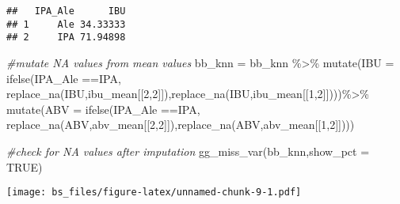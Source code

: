 \documentclass[
]{article}
\newenvironment{Shaded}{\begin{snugshade}}{\end{snugshade}}
\newcommand{\AttributeTok}[1]{\textcolor[rgb]{0.77,0.63,0.00}{#1}}
\newcommand{\CommentTok}[1]{\textcolor[rgb]{0.56,0.35,0.01}{\textit{#1}}}
\newcommand{\ConstantTok}[1]{\textcolor[rgb]{0.00,0.00,0.00}{#1}}
\newcommand{\DecValTok}[1]{\textcolor[rgb]{0.00,0.00,0.81}{#1}}
\newcommand{\FunctionTok}[1]{\textcolor[rgb]{0.00,0.00,0.00}{#1}}
\newcommand{\NormalTok}[1]{#1}
\newcommand{\OtherTok}[1]{\textcolor[rgb]{0.56,0.35,0.01}{#1}}
\newcommand{\SpecialCharTok}[1]{\textcolor[rgb]{0.00,0.00,0.00}{#1}}
\newcommand{\StringTok}[1]{\textcolor[rgb]{0.31,0.60,0.02}{#1}}
\begin{document}
\begin{verbatim}
##   IPA_Ale      IBU
## 1     Ale 34.33333
## 2     IPA 71.94898
\end{verbatim}

\begin{Shaded}
\begin{Highlighting}[]
\CommentTok{\#mutate NA values from mean values}
\NormalTok{bb\_knn }\OtherTok{=}\NormalTok{ bb\_knn }\SpecialCharTok{\%\textgreater{}\%}
   \FunctionTok{mutate}\NormalTok{(}\AttributeTok{IBU =} \FunctionTok{ifelse}\NormalTok{(IPA\_Ale }\SpecialCharTok{==}\StringTok{\textquotesingle{}IPA\textquotesingle{}}\NormalTok{, }\FunctionTok{replace\_na}\NormalTok{(IBU,ibu\_mean[[}\DecValTok{2}\NormalTok{,}\DecValTok{2}\NormalTok{]]),}\FunctionTok{replace\_na}\NormalTok{(IBU,ibu\_mean[[}\DecValTok{1}\NormalTok{,}\DecValTok{2}\NormalTok{]])))}\SpecialCharTok{\%\textgreater{}\%}
   \FunctionTok{mutate}\NormalTok{(}\AttributeTok{ABV =} \FunctionTok{ifelse}\NormalTok{(IPA\_Ale }\SpecialCharTok{==}\StringTok{\textquotesingle{}IPA\textquotesingle{}}\NormalTok{, }\FunctionTok{replace\_na}\NormalTok{(ABV,abv\_mean[[}\DecValTok{2}\NormalTok{,}\DecValTok{2}\NormalTok{]]),}\FunctionTok{replace\_na}\NormalTok{(ABV,abv\_mean[[}\DecValTok{1}\NormalTok{,}\DecValTok{2}\NormalTok{]])))}

\CommentTok{\#check for NA values after imputation}
\FunctionTok{gg\_miss\_var}\NormalTok{(bb\_knn,}\AttributeTok{show\_pct =} \ConstantTok{TRUE}\NormalTok{)}
\end{Highlighting}
\end{Shaded}

\texttt{[image: bs\_files/figure-latex/unnamed-chunk-9-1.pdf]}

\begin{Shaded}
\end{Shaded}
\end{document}
